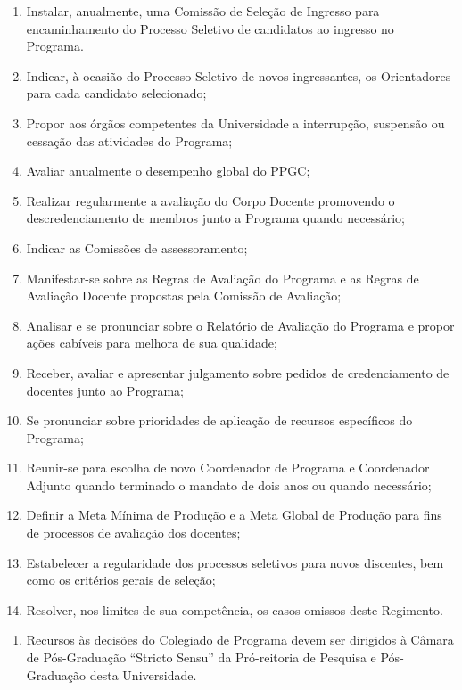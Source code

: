\documentclass{article}
\newcommand{\singleitem}{\item[Parágrafo Único.]}
\begin{document}
\begin{enumerate}
\begin{enumerate}[label=\Roman*]
		\item Instalar, anualmente, uma Comissão de Seleção de Ingresso para encaminhamento do Processo Seletivo de candidatos ao ingresso no Programa.
		\item Indicar, à ocasião do Processo Seletivo de novos ingressantes, os Orientadores para cada candidato selecionado; %
		\item Propor aos órgãos competentes da Universidade a interrupção, suspensão ou cessação das atividades do Programa;
		\item Avaliar anualmente o desempenho global do PPGC;
		\item Realizar regularmente a avaliação do Corpo Docente promovendo o descredenciamento de membros junto a Programa quando necessário;
		\item Indicar as Comissões de assessoramento;
		\item Manifestar-se sobre as Regras de Avaliação do Programa e as Regras de Avaliação Docente propostas pela Comissão de Avaliação;
		\item Analisar e se pronunciar sobre o Relatório de Avaliação do Programa e propor ações cabíveis para melhora de sua qualidade;
		\item Receber, avaliar e apresentar julgamento sobre pedidos de credenciamento de docentes junto ao Programa;
		\item Se pronunciar sobre prioridades de aplicação de recursos específicos do Programa;
		\item Reunir-se para escolha de novo Coordenador de Programa e Coordenador Adjunto quando terminado o mandato de dois anos ou quando necessário; 

		\item Definir a Meta Mínima de Produção e a Meta Global de Produção para fins de processos de avaliação dos docentes;

		\item Estabelecer a regularidade dos processos seletivos para novos discentes, bem como os critérios gerais de seleção;

		\item Resolver, nos limites de sua competência, os casos omissos deste Regimento.
	\end{enumerate}
	\begin{enumerate}
		\singleitem Recursos às decisões do Colegiado de Programa devem ser dirigidos à Câmara de Pós-Graduação ``Stricto Sensu'' da Pró-reitoria de Pesquisa e Pós-Graduação desta Universidade.
	\end{enumerate}
\end{enumerate}
\end{document}
